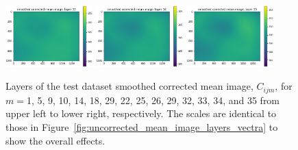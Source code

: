 \documentclass[letterpaper,11pt]{article}
\newcommand{\reffig}[1]{Figure~\ref{#1}}
\begin{document}
\begin{figure}[!ht]
\includegraphics[width=0.3\textwidth]{images/results/smoothed_corrected_mean_image_layers_vectra/smoothed_corrected_mean_image_layer_33_same_scale}
\includegraphics[width=0.3\textwidth]{images/results/smoothed_corrected_mean_image_layers_vectra/smoothed_corrected_mean_image_layer_34_same_scale}
\includegraphics[width=0.3\textwidth]{images/results/smoothed_corrected_mean_image_layers_vectra/smoothed_corrected_mean_image_layer_35_same_scale}
\caption{\footnotesize Layers of the test dataset smoothed corrected mean image, $C_{ijm}$, for $m=$1, 5, 9, 10, 14, 18, 29, 22, 25, 26, 29, 32, 33, 34, and 35 from upper left to lower right, respectively. The scales are identical to those in \reffig{fig:uncorrected_mean_image_layers_vectra} to show the overall effects.}
\label{fig:corrected_smoothed_mean_image_layers_same_scale_vectra}
\end{figure}
\end{document}
